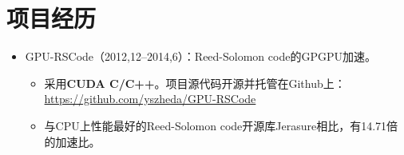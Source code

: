 \documentclass[letterpaper]{article}
\begin{document}
\section*{项目经历}
\begin{itemize}
  \item GPU-RSCode（2012,12--2014,6）：Reed-Solomon code的GPGPU加速。
    \begin{itemize}
      \item 采用\textbf{CUDA C/C++}。项目源代码开源并托管在Github上：\\
        \url{https://github.com/yszheda/GPU-RSCode}
      \item 与CPU上性能最好的Reed-Solomon code开源库Jerasure相比，有14.71倍的加速比。
    \end{itemize}

\end{itemize}
\end{document}
